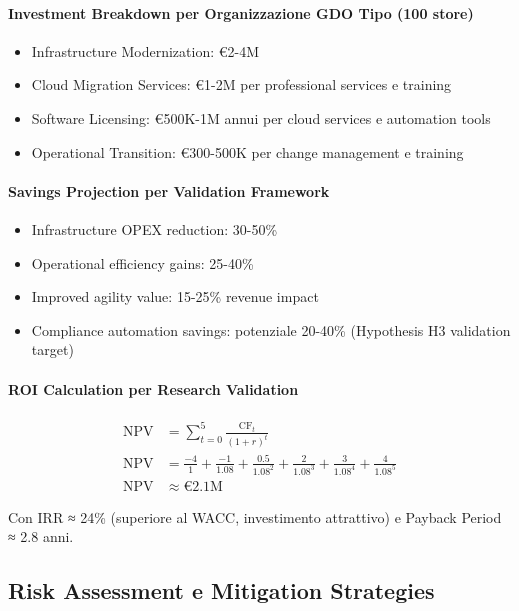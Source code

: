 \paragraph{Investment Breakdown per Organizzazione GDO Tipo (100 store)}
\begin{itemize}
    \item Infrastructure Modernization: €2-4M
    \item Cloud Migration Services: €1-2M per professional services e training
    \item Software Licensing: €500K-1M annui per cloud services e automation tools
    \item Operational Transition: €300-500K per change management e training
\end{itemize}

\paragraph{Savings Projection per Validation Framework}
\begin{itemize}
    \item Infrastructure OPEX reduction: 30-50\%
    \item Operational efficiency gains: 25-40\%
    \item Improved agility value: 15-25\% revenue impact
    \item Compliance automation savings: potenziale 20-40\% (Hypothesis H3 validation target)
\end{itemize}

\paragraph{ROI Calculation per Research Validation}

\begin{align}
\text{NPV} &= \sum_{t=0}^{5} \frac{\text{CF}_t}{(1 + r)^t} \label{eq:npv-calculation} \\
\text{NPV} &= \frac{-4}{1} + \frac{-1}{1.08} + \frac{0.5}{1.08^2} + \frac{2}{1.08^3} + \frac{3}{1.08^4} + \frac{4}{1.08^5} \nonumber \\
\text{NPV} &\approx €2.1\text{M} \nonumber
\end{align}

Con IRR ≈ 24\% (superiore al WACC, investimento attrattivo) e Payback Period ≈ 2.8 anni.

\subsection{Risk Assessment e Mitigation Strategies}
\label{subsec:risk-assessment}

